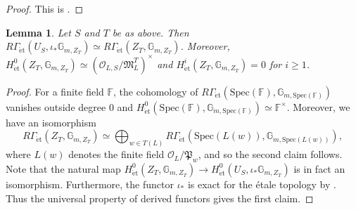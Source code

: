 \documentclass[12pt]{amsart}
\theoremstyle{plain}
\newtheorem{lemma}[theorem]{Lemma}
\theoremstyle{remark}
\theoremstyle{definition}
\numberwithin{equation}{section}
\begin{document}
{\begin{proof}
This is \cite[Chapter II, Proposition 2.1]{MR2261462}.
\end{proof}

\begin{lemma}\label{lem:qis-i-zt}
Let $S$ and $T$ be as above. 
Then $R\Gamma_{\mathrm{\acute{e}t}}(U_{S}, \iota_{\ast}\mathbb{G}_{m,Z_{T}}) \simeq R\Gamma_{\mathrm{\acute{e}t}}(Z_{T}, \mathbb{G}_{m,Z_{T}})$.
Moreover, $H^{0}_{\mathrm{\acute{e}t}}(Z_{T},\mathbb{G}_{m,Z_{T}}) \simeq (\mathcal{O}_{L,S} / \mathfrak{M}_{L}^{T})^{\times}$ and 
$H^{i}_{\mathrm{\acute{e}t}}(Z_{T},\mathbb{G}_{m,Z_{T}})=0$ for $i \geq 1$.
\end{lemma}

\begin{proof}
For a finite field $\mathbb{F}$, the cohomology of $R\Gamma_{\mathrm{\acute{e}t}}({\mathrm{Spec}}(\mathbb{F}), \mathbb{G}_{m,{\mathrm{Spec}}(\mathbb{F})})$
vanishes outside degree $0$ and $H_{\mathrm{\acute{e}t}}^{0}({\mathrm{Spec}}(\mathbb{F}), \mathbb{G}_{m,{\mathrm{Spec}}(\mathbb{F})}) \simeq {\mathbb{F}}^{\times}$.
Moreover, we have an isomorphism 
\[
R\Gamma_{\mathrm{\acute{e}t}}(Z_{T}, \mathbb{G}_{m,Z_{T}})
\simeq \bigoplus_{w \in T(L)} R\Gamma_{\mathrm{\acute{e}t}}({\mathrm{Spec}}(L(w)), \mathbb{G}_{m,{\mathrm{Spec}}(L(w))}),
\]
where $L(w)$ denotes the finite field $\mathcal{O}_{L} / \mathfrak{P}_{w}$, and so the second claim follows.
Note that the natural map 
$H^{0}_{\mathrm{\acute{e}t}}(Z_{T},\mathbb{G}_{m,Z_{T}}) \rightarrow H^{0}_{\mathrm{\acute{e}t}}(U_{S},\iota_{*}\mathbb{G}_{m,Z_{T}})$ is in fact an isomorphism.
Furthermore, the functor $\iota_{\ast}$ is exact for the \'{e}tale topology by \cite[Chapter II, Corollary 3.6]{MR559531}.
Thus the universal property of derived functors gives the first claim.
\end{proof}

}
\end{document}
